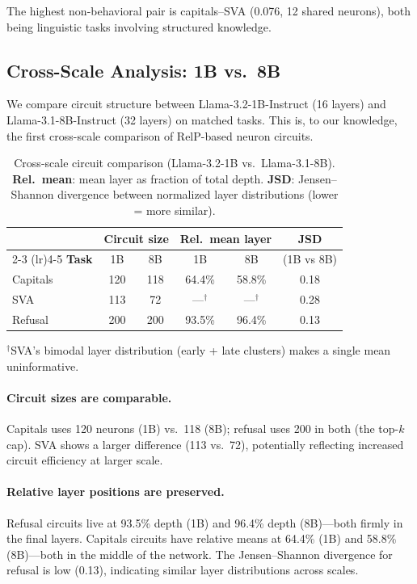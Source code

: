 \documentclass[11pt]{article}
\begin{document}
The highest non-behavioral pair is capitals--SVA (0.076, 12 shared neurons), both being linguistic tasks involving structured knowledge.


\subsection{Cross-Scale Analysis: 1B vs.\ 8B}
\label{sec:cross_scale}

We compare circuit structure between Llama-3.2-1B-Instruct (16 layers) and Llama-3.1-8B-Instruct (32 layers) on matched tasks.
This is, to our knowledge, the first cross-scale comparison of RelP-based neuron circuits.

\begin{table}[htbp]
\centering
\caption{Cross-scale circuit comparison (Llama-3.2-1B vs.\ Llama-3.1-8B). \textbf{Rel.\ mean}: mean layer as fraction of total depth. \textbf{JSD}: Jensen--Shannon divergence between normalized layer distributions (lower = more similar).}
\label{tab:cross_scale}
\small
\begin{tabular}{lccccc}
\toprule
& \multicolumn{2}{c}{\textbf{Circuit size}} & \multicolumn{2}{c}{\textbf{Rel.\ mean layer}} & \textbf{JSD} \\
\cmidrule(lr){2-3} \cmidrule(lr){4-5}
\textbf{Task} & 1B & 8B & 1B & 8B & (1B vs 8B) \\
\midrule
Capitals & 120 & 118 & 64.4\% & 58.8\% & 0.18 \\
SVA      & 113 &  72 & ---$^\dagger$    & ---$^\dagger$    & 0.28 \\
Refusal  & 200 & 200 & 93.5\% & 96.4\% & 0.13 \\
\bottomrule
\end{tabular}
\vspace{2pt}

{\footnotesize $^\dagger$SVA's bimodal layer distribution (early + late clusters) makes a single mean uninformative.}
\end{table}

\paragraph{Circuit sizes are comparable.}
Capitals uses 120 neurons (1B) vs.\ 118 (8B); refusal uses 200 in both (the top-$k$ cap).
SVA shows a larger difference (113 vs.\ 72), potentially reflecting increased circuit efficiency at larger scale.

\paragraph{Relative layer positions are preserved.}
Refusal circuits live at 93.5\% depth (1B) and 96.4\% depth (8B)---both firmly in the final layers.
Capitals circuits have relative means at 64.4\% (1B) and 58.8\% (8B)---both in the middle of the network.
The Jensen--Shannon divergence for refusal is low (0.13), indicating similar layer distributions across scales.
\end{document}
